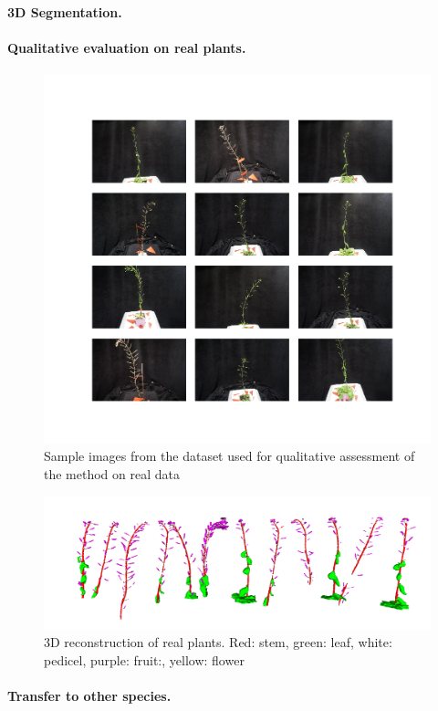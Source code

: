 \paragraph{3D Segmentation.}

\paragraph{Qualitative evaluation on real plants.}

\begin{figure}[h!]
    \centering \includegraphics[width = \linewidth]{figures/real_scans.png}
    \caption{Sample images from the dataset used for qualitative assessment of the method on real data} \label{fig:realscans}
\end{figure}

\begin{figure}[h!]
    \centering \includegraphics[width = \linewidth]{figures/3drec.png}
    \caption{3D reconstruction of real plants. Red: stem, green: leaf, white: pedicel, purple: fruit:, yellow: flower} \label{fig:rec3d}
\end{figure}

\paragraph{Transfer to other species.}


